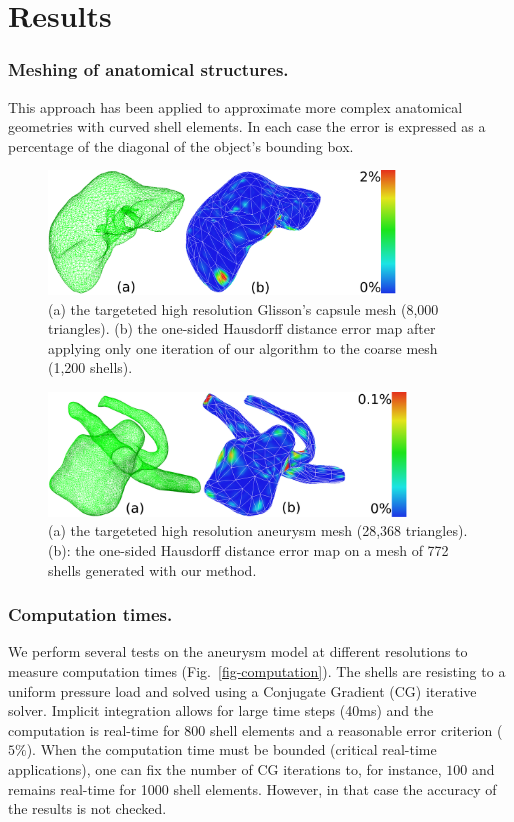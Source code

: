 \documentclass{llncs}
\begin{document}
\section{Results}
\label{sec:results}

\subsubsection{Meshing of anatomical structures.}
%
This approach has been applied to approximate more complex anatomical geometries with curved shell elements. In each case the error is expressed as a percentage of the diagonal of the object's bounding box. 
\begin{figure}
\centering
\includegraphics[height=3.3cm]{images/resultsLiver}
\caption {(a) the targeteted high resolution Glisson's capsule mesh (8,000 triangles). (b) the one-sided Hausdorff distance error map after applying only one iteration of our algorithm to the coarse mesh (1,200 shells).} 
\label{fig-liver}
\end{figure}

\begin{figure}
\centering
\includegraphics[height=3.3cm]{images/resultsAneurysm}
\caption {(a) the targeteted high resolution aneurysm mesh (28,368 triangles). (b): the one-sided Hausdorff distance error map on a mesh of 772 shells generated with our method.}
\label{fig-aneurysm}
\end{figure}

\subsubsection{Computation times.}
%
We perform several tests on the aneurysm model at different resolutions to measure computation times (Fig.~\ref{fig-computation}). The shells are resisting to a uniform pressure load and solved using a Conjugate Gradient (CG) iterative solver.
Implicit integration allows for large time steps (40ms) and the computation is real-time for 800 shell elements and a reasonable error criterion ($5\%$).
When the computation time must be bounded (critical real-time applications), one can fix the number of CG iterations to, for instance, $100$ and remains real-time for 1000 shell elements. However, in that case the accuracy of the results is not checked.
\end{document}
